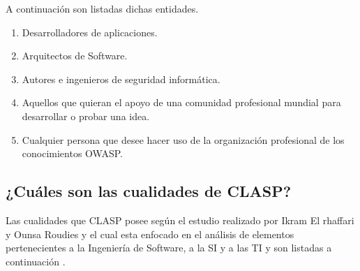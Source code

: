 \documentclass[runningheads,a4paper]{llncs}
\begin{document}
A continuación son listadas dichas entidades.

\begin{enumerate}
	\item Desarrolladores de aplicaciones.
	\item Arquitectos de \gls{Software}.
	\item Autores e ingenieros de seguridad informática.
	\item Aquellos que quieran el apoyo de una comunidad profesional mundial para desarrollar o probar una idea.
	\item Cualquier persona que desee hacer uso de la organización profesional de los conocimientos \gls{OWASP}.
\end{enumerate}
\subsection{¿Cuáles son las cualidades de \gls{CLASP}?}
Las cualidades que \gls{CLASP} posee según el estudio realizado por Ikram El rhaffari y Ounsa Roudies y el cual esta enfocado en el análisis de elementos pertenecientes a la Ingeniería de \gls{Software}, a la \gls{SI} y a las \gls{TI} y son listadas a continuación \cite{BenchmarkingSDLCLAPS}. 
\end{document}
